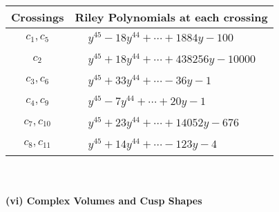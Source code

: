\documentclass[1p]{elsarticle_modified}
\theoremstyle{definition}
\begin{document}
\begin{tabular}{m{50pt}|m{274pt}}
Crossings & \hspace{64pt}Riley Polynomials at each crossing \\
\hline $$\begin{aligned}c_{1},c_{5}\end{aligned}$$&$\begin{aligned}
&y^{45}-18 y^{44}+\cdots+1884 y-100
\end{aligned}$\\
\hline $$\begin{aligned}c_{2}\end{aligned}$$&$\begin{aligned}
&y^{45}+18 y^{44}+\cdots+438256 y-10000
\end{aligned}$\\
\hline $$\begin{aligned}c_{3},c_{6}\end{aligned}$$&$\begin{aligned}
&y^{45}+33 y^{44}+\cdots-36 y-1
\end{aligned}$\\
\hline $$\begin{aligned}c_{4},c_{9}\end{aligned}$$&$\begin{aligned}
&y^{45}-7 y^{44}+\cdots+20 y-1
\end{aligned}$\\
\hline $$\begin{aligned}c_{7},c_{10}\end{aligned}$$&$\begin{aligned}
&y^{45}+23 y^{44}+\cdots+14052 y-676
\end{aligned}$\\
\hline $$\begin{aligned}c_{8},c_{11}\end{aligned}$$&$\begin{aligned}
&y^{45}+14 y^{44}+\cdots-123 y-4
\end{aligned}$\\
\hline
\end{tabular}\\~\\
\newpage\flushleft \textbf{(vi) Complex Volumes and Cusp Shapes}
\end{document}
